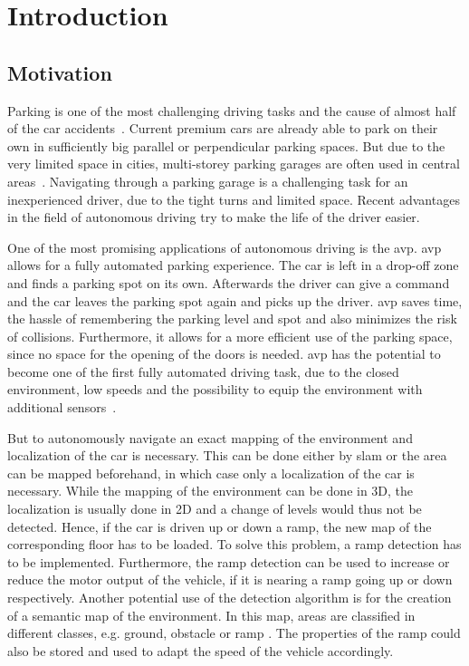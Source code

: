 \chapter{Introduction}
\label{ch:Introduction}

\section{Motivation}
Parking is one of the most challenging driving tasks and the cause of almost half of the car accidents~\cite{accident2015}.
Current premium cars are already able to park on their own in sufficiently big parallel or perpendicular parking spaces.
But due to the very limited space in cities, multi-storey parking garages are often used in central areas~\cite{Khalid2021}.
Navigating through a parking garage is a challenging task for an inexperienced driver, due to the tight turns and limited space.
Recent advantages in the field of autonomous driving try to make the life of the driver easier.

One of the most promising applications of autonomous driving is the \gls{avp}.
\gls{avp} allows for a fully automated parking experience.
The car is left in a drop-off zone and finds a parking spot on its own.
Afterwards the driver can give a command and the car leaves the parking spot again and picks up the driver.
\gls{avp} saves time, the hassle of remembering the parking level and spot and also minimizes the risk of collisions.
Furthermore, it allows for a more efficient use of the parking space, since no space for the opening of the doors is needed.
\gls{avp} has the potential to become one of the first fully automated driving task, due to the closed environment, low speeds and the possibility to equip the environment with additional sensors~\cite{Banzhaf2017}.

But to autonomously navigate an exact mapping of the environment and localization of the car is necessary.
This can be done either by \gls{slam} or the area can be mapped beforehand, in which case only a localization of the car is necessary.
While the mapping of the environment can be done in 3D, the localization is usually done in 2D and a change of levels would thus not be detected.
Hence, if the car is driven up or down a ramp, the new map of the corresponding floor has to be loaded.
To solve this problem, a ramp detection has to be implemented.
Furthermore, the ramp detection can be used to increase or reduce the motor output of the vehicle, if it is nearing a ramp going up or down respectively.
Another potential use of the detection algorithm is for the creation of a semantic map of the environment.
In this map, areas are classified in different classes, e.g. ground, obstacle or ramp \cite{Sakenas2007}.
The properties of the ramp could also be stored and used to adapt the speed of the vehicle accordingly.



